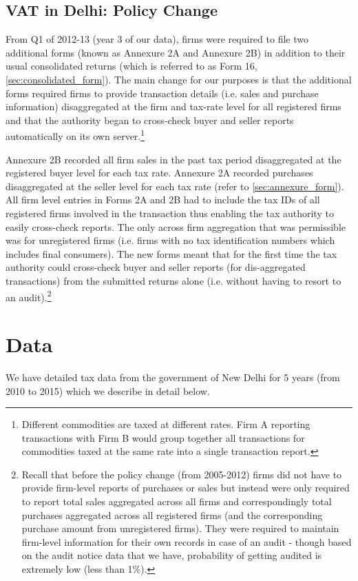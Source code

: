 \subsection{VAT in Delhi: Policy Change}
\label{background_policychange}
From Q1 of 2012-13 (year 3 of our data), firms were required to file two additional forms (known as Annexure 2A and Annexure 2B) in addition to their usual consolidated returns (which is referred to as Form 16, \cref{sec:consolidated_form}). The main change for our purposes is that the additional forms required firms to provide transaction details (i.e. sales and purchase information) disaggregated at the firm and tax-rate level for all registered firms and that the authority began to cross-check buyer and seller reports automatically on its own server.\footnote{Different commodities are taxed at different rates. Firm A reporting transactions with Firm B would group together all transactions for commodities taxed at the same rate into a single transaction report.}

Annexure 2B recorded all firm sales in the past tax period disaggregated at the registered buyer level for each tax rate. Annexure 2A recorded purchases  disaggregated at the seller level for each tax rate (refer to \cref{sec:annexure_form}). All firm level entries in Forms 2A and 2B had to include the tax IDs of all registered firms involved in the transaction thus enabling the tax authority to easily cross-check reports. The only across firm aggregation that was permissible was for unregistered firms (i.e. firms with no tax identification numbers which includes final consumers). The new forms meant that for the first time the tax authority could cross-check buyer and seller reports (for dis-aggregated transactions) from the submitted returns alone (i.e. without having to resort to an audit).\footnote{Recall that before the policy change (from 2005-2012) firms did not have to provide firm-level reports of purchases or sales but instead were only required to report total sales aggregated across all firms and correspondingly total purchases aggregated across all registered firms (and the corresponding purchase amount from unregistered firms). They were required to maintain firm-level information for their own records in case of an audit - though based on the audit notice data that we have, probability of getting audited is extremely low (less than 1\%).}

\section{Data}
\label{sec:1-data}
We have detailed tax data from the government of New Delhi for 5 years (from 2010 to 2015) which we describe in detail below.

